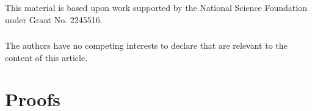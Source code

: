 \documentclass[runningheads]{llncs}
\begin{document}


\begin{credits}
\subsubsection{\ackname}
% 
This material is based upon work supported by the National Science Foundation
under Grant No. 2245516.

\subsubsection{\discintname}
%
The authors have no competing interests to declare that are
relevant to the content of this article.
\end{credits}
%
%
%
\newpage


% 


\newpage
\appendix

% 

\section{Proofs}
\label{sec:proofs}

\end{document}
